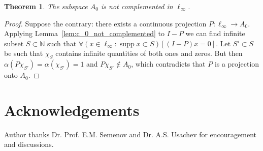 \documentclass[a4paper,14pt]{article} %
\DeclareMathOperator{\supp}{supp}
\theoremstyle{plain}
\newtheorem{theorem}{Theorem}[section]
\theoremstyle{definition}
\begin{document}
\begin{theorem}
	The subspace $A_0$ is not complemented in $\ell_\infty$.
\end{theorem}

\begin{proof}
	Suppose the contrary:
	there exists a continuous projection $P: \ell_\infty \to A_0$.
	Applying Lemma~\ref{lem:c_0_not_complemented} to $I-P$
	we can find infinite subset $S\subset\mathbb{N}$
	such that $\forall(x\in\ell_\infty : \supp x \subset S)[(I-P)x = 0]$.
	Let $S' \subset S$ be such that $\chi_S$ contains
	infinite quantities of both ones and zeros.
	But then $\alpha(P\chi_{S'}) = \alpha(\chi_{S'}) = 1$ and $P\chi_{S'} \notin A_0$,
	which contradicts that $P$ is a projection onto $A_0$.
\end{proof}



\section{Acknowledgements}
Author thanks Dr. Prof. E.M. Semenov and Dr. A.S. Usachev for encouragement and discussions.


\printbibliography
\end{document}
